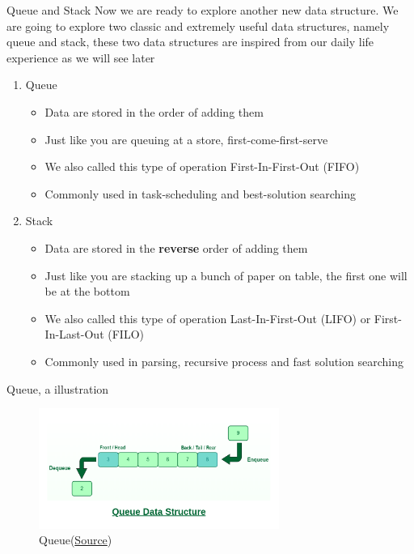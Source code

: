\documentclass[10pt,xcolor={table,dvipsnames},t]{beamer}
\begin{document}
\begin{frame}{Queue and Stack}
  Now we are ready to explore another new data structure. We are going to explore two classic and extremely useful data structures, namely queue and stack, these two data structures are inspired from our daily life experience as we will see later
  \begin{enumerate}
    \item Queue
    \begin{itemize}
      \item Data are stored in the order of adding them
      \item Just like you are queuing at a store, first-come-first-serve
      \item We also called this type of operation First-In-First-Out (FIFO)
      \item Commonly used in task-scheduling and best-solution searching
    \end{itemize}
    \item Stack
    \begin{itemize}
      \item Data are stored in the \textbf{reverse} order of adding them
      \item Just like you are stacking up a bunch of paper on table, the first one will be at the bottom
      \item We also called this type of operation Last-In-First-Out (LIFO) or First-In-Last-Out (FILO)
      \item Commonly used in parsing, recursive process and fast solution searching
    \end{itemize}
  \end{enumerate}
\end{frame}

\begin{frame}{Queue, a illustration}
  \begin{figure}[h!]
    \includegraphics[width=0.7\textwidth]{img/queue.png}
    \caption{Queue(\href{https://www.geeksforgeeks.org/queue-data-structure/}{Source})}
  \end{figure}
\end{frame}
\end{document}
